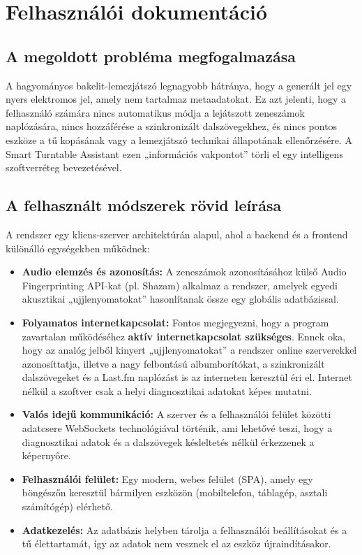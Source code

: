 
\chapter{Felhasználói dokumentáció}

\section{A megoldott probléma megfogalmazása}
A hagyományos bakelit-lemezjátszó legnagyobb hátránya, hogy a generált jel egy nyers elektromos jel, amely nem tartalmaz metaadatokat. Ez azt jelenti, hogy a felhasználó számára nincs automatikus módja a lejátszott zeneszámok naplózására, nincs hozzáférése a szinkronizált dalszövegekhez, és nincs pontos eszköze a tű kopásának vagy a lemezjátszó technikai állapotának ellenőrzésére. A Smart Turntable Assistant ezen „információs vakpontot” törli el egy intelligens szoftverréteg bevezetésével.

\section{A felhasznált módszerek rövid leírása}
A rendszer egy kliens-szerver architektúrán alapul, ahol a backend és a frontend különálló egységekben működnek:
\begin{itemize}
    \item \textbf{Audio elemzés és azonosítás:} A zeneszámok azonosításához külső Audio Fingerprinting API-kat (pl. Shazam) alkalmaz a rendszer, amelyek egyedi akusztikai „ujjlenyomatokat” hasonlítanak össze egy globális adatbázissal. 
    \item \textbf{Folyamatos internetkapcsolat:} Fontos megjegyezni, hogy a program zavartalan működéséhez \textbf{aktív internetkapcsolat szükséges}. Ennek oka, hogy az analóg jelből kinyert „ujjlenyomatokat” a rendszer online szerverekkel azonosíttatja, illetve a nagy felbontású albumborítókat, a szinkronizált dalszövegeket és a Last.fm naplózást is az interneten keresztül éri el. Internet nélkül a szoftver csak a helyi diagnosztikai adatokat képes mutatni.
    \item \textbf{Valós idejű kommunikáció:} A szerver és a felhasználói felület közötti adatcsere WebSockets technológiával történik, ami lehetővé teszi, hogy a diagnosztikai adatok és a dalszövegek késleltetés nélkül érkezzenek a képernyőre.
    \item \textbf{Felhasználói felület:} Egy modern, webes felület (SPA), amely egy böngészőn keresztül bármilyen eszközön (mobiltelefon, táblagép, asztali számítógép) elérhető.
    \item \textbf{Adatkezelés:} Az adatbázis helyben tárolja a felhasználói beállításokat és a tű élettartamát, így az adatok nem vesznek el az eszköz újraindításakor.
\end{itemize}

